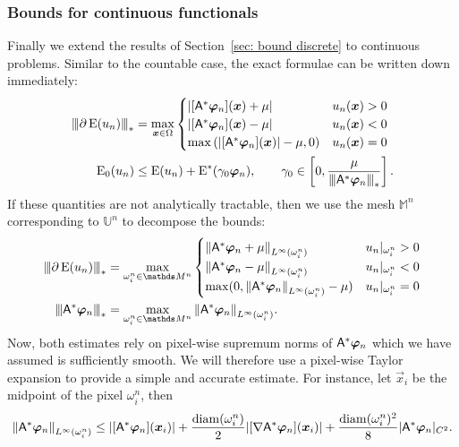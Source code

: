 \documentclass[smallextended]{svjour3}
\let\F\mathds\let\C\mathcal\newcommand{\R}{\F{R}}\newcommand{\A}{\tens{A}}
\newcommand{\norm}[1]{{\left\lVert #1 \right\rVert}}
\newcommand{\Norm}[1]{{\left\vert\kern-0.25ex\left\vert\kern-0.25ex\left\vert #1 \right\vert\kern-0.25ex\right\vert\kern-0.25ex\right\vert}}
\newcommand{\op}[1]{\operatorname{#1}}
\newcommand{\1}{\F{1}}
\newcommand{\Domain}{\Omega}\newcommand{\domain}{\omega}
\newcommand*{\var}[1]{%
	\IfEqCase{#1}{%
		{0}{u}%
		{1}{v}%
		{2}{w}%
	}[u#1]%
}
\newcommand*{\vars}[1]{%
	\IfEqCase{#1}{%
		{0}{\alpha}%
		{1}{\beta}%
		{2}{\gamma}%
		{3}{a}%
		{4}{b}%
		{5}{c}%
	}[k#1]%
}
\begin{document}
	\subsubsection{Bounds for continuous functionals}\label{sec: bound continuous}
	Finally we extend the results of Section~\ref{sec: bound discrete} to continuous problems. Similar to the countable case, the exact formulae can be written down immediately:
	\begin{align}
		\Norm{\partial\op{E}(\var0_n)}_* &= \max_{\vec{x}\in\Domain}\begin{cases}
			|[\A^*\vec{\varphi}_n](\vec{x}) + \mu| & \var0_n(\vec{x})>0
			\\|[\A^*\vec{\varphi}_n](\vec{x}) - \mu| & \var0_n(\vec{x})<0
			\\\max\left(|[\A^*\vec{\varphi}_n](\vec{x})| - \mu, 0\right) & \var0_n(\vec{x}) = 0
		\end{cases}
		\\ \op{E}_0(\var0_n) &\leq \op{E}(\var0_n) + \op{E}^*(\vars2_0\vec{\varphi}_n), \qquad \vars2_0\in\left[0,\frac{\mu}{\Norm{\A^*\vec{\varphi}_n}_*}\right].
	\end{align}
	If these quantities are not analytically tractable, then we use the mesh $\F M^n$ corresponding to $\F{U}^n$ to decompose the bounds:
	\begin{align}
		\Norm{\partial \op{E}(\var0_n)}_* &= \max_{\domain_i^n\in\F M^n} \begin{cases}
			\norm{\A^*\vec{\varphi}_n + \mu}_{L^\infty(\domain_i^n)} & \var0_n|_{\domain_i^n} > 0
			\\\norm{\A^*\vec{\varphi}_n - \mu}_{L^\infty(\domain_i^n)} & \var0_n|_{\domain_i^n} < 0
			\\\max(0, \norm{\A^*\vec{\varphi}_n}_{L^\infty(\domain_i^n)}-\mu) & \var0_n|_{\domain_i^n} = 0
		\end{cases}
		\\ \Norm{\A^*\vec{\varphi}_n}_* &= \max_{\domain_i^n\in\F M^n} \norm{\A^*\vec{\varphi}_n}_{L^\infty(\domain_i^n)}.
	\end{align}
	Now, both estimates rely on pixel-wise supremum norms of $\A^*\vec{\varphi}_n$ which we have assumed is sufficiently smooth. We will therefore use a pixel-wise Taylor expansion to provide a simple and accurate estimate. For instance, let $\vec{x}_i$ be the midpoint of the pixel $\domain_i^n$, then 
	\begin{equation}\label{eq: Taylor approximation}
		\norm{\A^*\vec{\varphi}_n}_{L^\infty(\domain_i^n)} \leq |[\A^*\vec{\varphi}_n](\vec{x}_i)| + \frac{\op{diam}(\domain_i^n)}{2}|[\nabla\A^*\vec{\varphi}_n](\vec{x}_i)| + \frac{\op{diam}(\domain_i^n)^2}{8}|\A^*\vec{\varphi}_n|_{C^2}.
	\end{equation}
\end{document}
